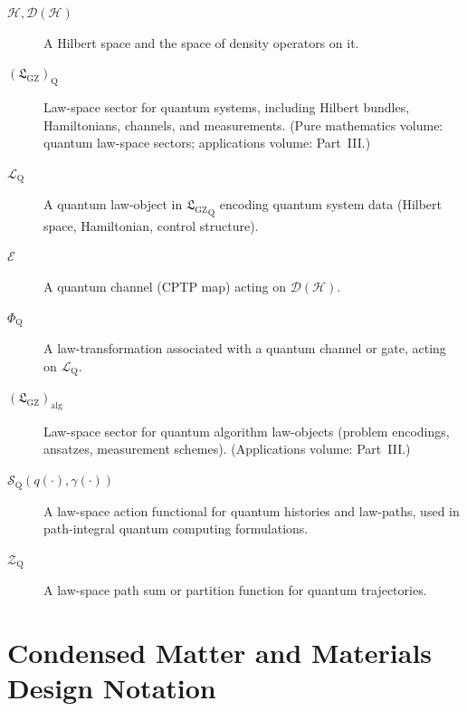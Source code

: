 \documentclass[11pt]{book}
\newcommand{\GZLS}{\ensuremath{\mathfrak{L}_{\mathrm{GZ}}}}
\theoremstyle{plain}
\theoremstyle{definition}
\theoremstyle{remark}
\begin{document}
\begin{description}
  \item[$\mathcal{H},\mathcal{D}(\mathcal{H})$]
    A Hilbert space and the space of density operators on it.
  \item[$(\GZLS)_{\mathrm{Q}}$]
    Law-space sector for quantum systems, including Hilbert bundles,
    Hamiltonians, channels, and measurements. (Pure mathematics
    volume: quantum law-space sectors; applications volume: Part~III.)
  \item[$\mathcal{L}_{\mathrm{Q}}$]
    A quantum law-object in ${\GZLS}_{\mathrm{Q}}$ encoding quantum
    system data (Hilbert space, Hamiltonian, control structure).
  \item[$\mathcal{E}$]
    A quantum channel (CPTP map) acting on $\mathcal{D}(\mathcal{H})$.
  \item[$\Phi_{\mathrm{Q}}$]
    A law-transformation associated with a quantum channel or gate,
    acting on $\mathcal{L}_{\mathrm{Q}}$.
  \item[$(\GZLS)_{\mathrm{alg}}$]
    Law-space sector for quantum algorithm law-objects (problem
    encodings, ansatzes, measurement schemes). (Applications volume:
    Part~III.)
  \item[$\mathcal{S}_{\mathrm{Q}}(q(\cdot),\gamma(\cdot))$]
    A law-space action functional for quantum histories and
    law-paths, used in path-integral quantum computing formulations.
  \item[$\mathcal{Z}_{\mathrm{Q}}$]
    A law-space path sum or partition function for quantum
    trajectories.
\end{description}

\section*{Condensed Matter and Materials Design Notation}
\end{document}
